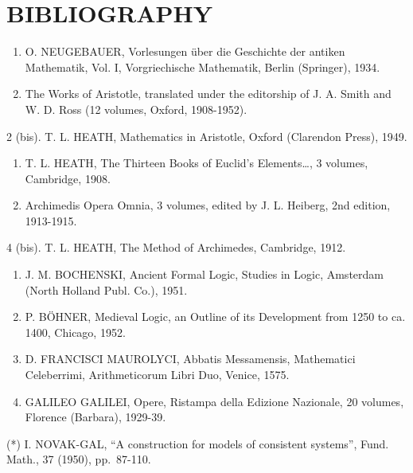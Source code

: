 \section*{BIBLIOGRAPHY}
{}

\begin{enumerate}
\def\labelenumi{\arabic{enumi}.}
\item
  O. NEUGEBAUER, Vorlesungen über die Geschichte der antiken Mathematik, Vol. I, Vorgriechische Mathematik, Berlin (Springer), 1934.
\item
  The Works of Aristotle, translated under the editorship of J. A. Smith and W. D. Ross (12 volumes, Oxford, 1908-1952).
\end{enumerate}

2 (bis). T. L. HEATH, Mathematics in Aristotle, Oxford (Clarendon Press), 1949.

\begin{enumerate}
\def\labelenumi{\arabic{enumi}.}
\setcounter{enumi}{2}
\item
  T. L. HEATH, The Thirteen Books of Euclid's Elements\ldots, 3 volumes, Cambridge, 1908.
\item
  Archimedis Opera Omnia, 3 volumes, edited by J. L. Heiberg, 2nd edition, 1913-1915.
\end{enumerate}

4 (bis). T. L. HEATH, The Method of Archimedes, Cambridge, 1912.

\begin{enumerate}
\def\labelenumi{\arabic{enumi}.}
\setcounter{enumi}{4}
\item
  J. M. BOCHENSKI, Ancient Formal Logic, Studies in Logic, Amsterdam (North Holland Publ. Co.), 1951.
\item
  P. BÖHNER, Medieval Logic, an Outline of its Development from 1250 to ca. 1400, Chicago, 1952.
\item
  D. FRANCISCI MAUROLYCI, Abbatis Messamensis, Mathematici Celeberrimi, Arithmeticorum Libri Duo, Venice, 1575.
\item
  GALILEO GALILEI, Opere, Ristampa della Edizione Nazionale, 20 volumes, Florence (Barbara), 1929-39.
\end{enumerate}

(*) I. NOVAK-GAL, ``A construction for models of consistent systems'', Fund. Math., 37 (1950), pp.~87-110.

